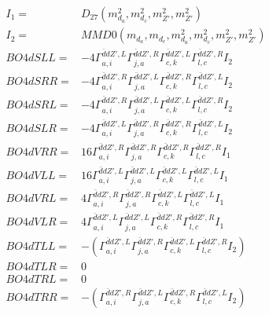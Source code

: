 \documentclass[A4,landscape]{article}
\begin{document}
\begin{align} 
I_1 = & D_{27}(m^2_{d_{{a}}}, m^2_{d_{{c}}}, m^2_{{Z'}}, m^2_{{Z'}}) \\ 
I_2 = & MMD0(m_{d_{{a}}}, m_{d_{{c}}}, m^2_{d_{{a}}}, m^2_{d_{{c}}}, m^2_{{Z'}}, m^2_{{Z'}}) \\ 
  BO4dSLL= & -4  \Gamma^{\bar{d}d {Z'} ,L}_{a, i} \Gamma^{\bar{d}d {Z'} ,R}_{j, a} \Gamma^{\bar{d}d {Z'} ,L}_{c, k} \Gamma^{\bar{d}d {Z'} ,R}_{l, c} I_2 \\ 
  BO4dSRR= & -4  \Gamma^{\bar{d}d {Z'} ,R}_{a, i} \Gamma^{\bar{d}d {Z'} ,L}_{j, a} \Gamma^{\bar{d}d {Z'} ,R}_{c, k} \Gamma^{\bar{d}d {Z'} ,L}_{l, c} I_2 \\ 
  BO4dSRL= & -4  \Gamma^{\bar{d}d {Z'} ,R}_{a, i} \Gamma^{\bar{d}d {Z'} ,L}_{j, a} \Gamma^{\bar{d}d {Z'} ,L}_{c, k} \Gamma^{\bar{d}d {Z'} ,R}_{l, c} I_2 \\ 
  BO4dSLR= & -4  \Gamma^{\bar{d}d {Z'} ,L}_{a, i} \Gamma^{\bar{d}d {Z'} ,R}_{j, a} \Gamma^{\bar{d}d {Z'} ,R}_{c, k} \Gamma^{\bar{d}d {Z'} ,L}_{l, c} I_2 \\ 
  BO4dVRR= & 16  \Gamma^{\bar{d}d {Z'} ,R}_{a, i} \Gamma^{\bar{d}d {Z'} ,R}_{j, a} \Gamma^{\bar{d}d {Z'} ,R}_{c, k} \Gamma^{\bar{d}d {Z'} ,R}_{l, c} I_1 \\ 
  BO4dVLL= & 16  \Gamma^{\bar{d}d {Z'} ,L}_{a, i} \Gamma^{\bar{d}d {Z'} ,L}_{j, a} \Gamma^{\bar{d}d {Z'} ,L}_{c, k} \Gamma^{\bar{d}d {Z'} ,L}_{l, c} I_1 \\ 
  BO4dVRL= & 4  \Gamma^{\bar{d}d {Z'} ,R}_{a, i} \Gamma^{\bar{d}d {Z'} ,R}_{j, a} \Gamma^{\bar{d}d {Z'} ,L}_{c, k} \Gamma^{\bar{d}d {Z'} ,L}_{l, c} I_1 \\ 
  BO4dVLR= & 4  \Gamma^{\bar{d}d {Z'} ,L}_{a, i} \Gamma^{\bar{d}d {Z'} ,L}_{j, a} \Gamma^{\bar{d}d {Z'} ,R}_{c, k} \Gamma^{\bar{d}d {Z'} ,R}_{l, c} I_1 \\ 
  BO4dTLL= & -( \Gamma^{\bar{d}d {Z'} ,L}_{a, i} \Gamma^{\bar{d}d {Z'} ,R}_{j, a} \Gamma^{\bar{d}d {Z'} ,L}_{c, k} \Gamma^{\bar{d}d {Z'} ,R}_{l, c} I_2) \\ 
  BO4dTLR= & 0 \\ 
  BO4dTRL= & 0 \\ 
  BO4dTRR= & -( \Gamma^{\bar{d}d {Z'} ,R}_{a, i} \Gamma^{\bar{d}d {Z'} ,L}_{j, a} \Gamma^{\bar{d}d {Z'} ,R}_{c, k} \Gamma^{\bar{d}d {Z'} ,L}_{l, c} I_2) \\ 
\end{align} 
\end{document}
